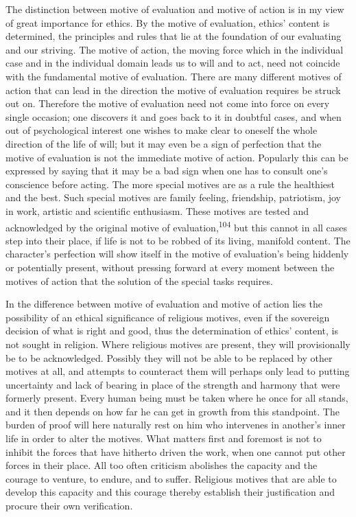 \documentclass[12pt,a4paper]{book}
\newcommand{\opage}[1]{\marginnote{\footnotesize\textit{[#1]}}}
\begin{document}
The distinction between motive of evaluation and motive of action is in my view of great importance
for ethics. By the motive of evaluation, ethics' content is determined, the principles and rules
that lie at the foundation of our evaluating and our striving. The motive of action, the moving
force which in the individual case and in the individual domain leads us to will and to act, need
not coincide with the fundamental motive of evaluation. There are many different motives of action
that can lead in the direction the motive of evaluation requires be struck out on. Therefore the
motive of evaluation need not come into force on every single occasion; one discovers it and goes
back to it in doubtful cases, and when out of psychological interest one wishes to make clear to
oneself 
\opage{218}the whole direction of the life of will; but it may even be a sign of perfection that the
motive of evaluation is not the immediate motive of action. Popularly this can be expressed by
saying that it may be a bad sign when one has to consult one's conscience before acting. The more
special motives are as a rule the healthiest and the best. Such special motives are family feeling,
friendship, patriotism, joy in work, artistic and scientific enthusiasm. These motives are tested
and acknowledged by the original motive of evaluation,\textsuperscript{104} but this cannot in all
cases step into their place, if life is not to be robbed of its living, manifold content. The
character's perfection will show itself in the motive of evaluation's being hiddenly or potentially
present, without pressing forward at every moment between the motives of action that the solution of
the special tasks requires.

In the difference between motive of evaluation and motive of action lies the possibility of an
ethical significance of religious motives, even if the sovereign decision of what is right and good,
thus the determination of ethics' content, is not sought in religion. Where religious motives are
present, they will provisionally be to be acknowledged. Possibly they will not be able to be replaced
by other motives at all, and attempts to counteract them will perhaps only lead to putting uncertainty
and lack of bearing in place of the strength and harmony that were formerly present. Every human being
must be taken where he once for all stands, and it then depends on how far he can get in growth from
this standpoint. The burden of proof will here naturally rest on him who intervenes in another's inner
life in order to alter the motives. What matters first and foremost is not to inhibit the forces that
have hitherto driven the work, when one cannot put other forces in their place. All too often criticism
abolishes the capacity and the courage to venture, to endure, and to suffer. Religious motives that are
able to develop this capacity and this courage thereby establish their justification and procure their
own verification.
\end{document}
